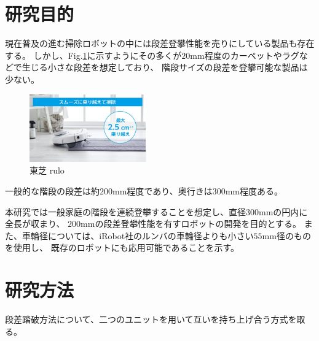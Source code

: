 \documentclass[dvipdfmx]{jsarticle}
\begin{document}
\section{研究目的}
現在普及の進む掃除ロボットの中には段差登攀性能を売りにしている製品も存在する。
しかし、Fig.\ref{fig:rulo}に示すようにその多くが$20\mathrm{mm}$程度のカーペットやラグなどで生じる小さな段差を想定しており、
階段サイズの段差を登攀可能な製品は少ない。
\begin{figure}[H]
\centering
\includegraphics[width=50mm]{image/rulo.jpg}
\caption{東芝 rulo}
\label{fig:rulo}
\end{figure}

一般的な階段の段差は約$200\mathrm{mm}$程度であり、奥行きは$300\mathrm{mm}$程度ある。

本研究では一般家庭の階段を連続登攀することを想定し、直径$300\mathrm{mm}$の円内に全長が収まり、
$200\mathrm{mm}$の段差登攀性能を有すロボットの開発を目的とする。
また、車輪径については、iRobot社のルンバの車輪径よりも小さい$55\mathrm{mm}$径のものを使用し、
既存のロボットにも応用可能であることを示す。

\section{研究方法}
段差踏破方法について、二つのユニットを用いて互いを持ち上げ合う方式を取る。
\end{document}
